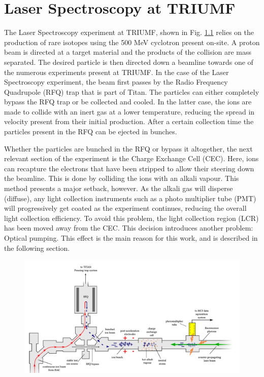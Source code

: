 \documentclass[12pt,a4paper,margin=1in]{report}
\begin{document}
\chapter{Laser Spectroscopy at TRIUMF}
\label{Lspec}
The Laser Spectroscopy experiment at TRIUMF, shown in Fig. \ref{exp} relies on the production of rare isotopes using the 500 MeV cyclotron present on-site. A proton beam is directed at a target material and the products of the collision are mass separated. The desired particle is then directed down a beamline towards one of the numerous experiments present at TRIUMF. In the case of the Laser Spectroscopy experiment, the beam first passes by the Radio Frequency Quadrupole (RFQ) trap that is part of Titan. The particles can either completely bypass the RFQ trap or be collected and cooled. In the latter case, the ions are made to collide with an inert gas at a lower temperature, reducing the spread in velocity present from their initial production. After a certain collection time the particles present in the RFQ can be ejected in bunches.

Whether the particles are bunched in the RFQ or bypass it altogether, the next relevant section of the experiment is the Charge Exchange Cell (CEC). Here, ions can recapture the electrons that have been stripped to allow their steering down the beamline. This is done by colliding the ions with an alkali vapour. This method presents a major setback, however. As the alkali gas will disperse (diffuse), any light collection instruments such as a photo multiplier tube (PMT) will progressively get coated as the experiment continues, reducing the overall light collection efficiency. To avoid this problem, the light collection region (LCR) has been moved away from the CEC. This decision introduces another problem: Optical pumping. This effect is the main reason for this work, and is described in the following section.

\begin{figure}
\includegraphics[width=\textwidth]{experiment.png}
\label{exp}
\end{figure}
\end{document}
